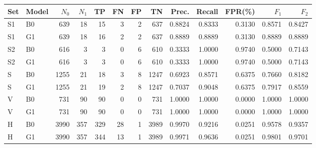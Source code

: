 \begin{tabular}{llrrrrrrrrrrr}
\toprule
Set & Model & $N_0$ & $N_1$ & TP & FN & FP & TN & Prec. & Recall & FPR(\%) & $F_1$ & $F_2$ \\
\midrule
S1 & B0 & 639 & 18 & 15 & 3 & 2 & 637 & 0.8824 & 0.8333 & 0.3130 & 0.8571 & 0.8427 \\
S1 & G1 & 639 & 18 & 16 & 2 & 2 & 637 & 0.8889 & 0.8889 & 0.3130 & 0.8889 & 0.8889 \\
S2 & B0 & 616 & 3 & 3 & 0 & 6 & 610 & 0.3333 & 1.0000 & 0.9740 & 0.5000 & 0.7143 \\
S2 & G1 & 616 & 3 & 3 & 0 & 6 & 610 & 0.3333 & 1.0000 & 0.9740 & 0.5000 & 0.7143 \\
S & B0 & 1255 & 21 & 18 & 3 & 8 & 1247 & 0.6923 & 0.8571 & 0.6375 & 0.7660 & 0.8182 \\
S & G1 & 1255 & 21 & 19 & 2 & 8 & 1247 & 0.7037 & 0.9048 & 0.6375 & 0.7917 & 0.8559 \\
V & B0 & 731 & 90 & 90 & 0 & 0 & 731 & 1.0000 & 1.0000 & 0.0000 & 1.0000 & 1.0000 \\
V & G1 & 731 & 90 & 90 & 0 & 0 & 731 & 1.0000 & 1.0000 & 0.0000 & 1.0000 & 1.0000 \\
H & B0 & 3990 & 357 & 329 & 28 & 1 & 3989 & 0.9970 & 0.9216 & 0.0251 & 0.9578 & 0.9357 \\
H & G1 & 3990 & 357 & 344 & 13 & 1 & 3989 & 0.9971 & 0.9636 & 0.0251 & 0.9801 & 0.9701 \\
\bottomrule
\end{tabular}
